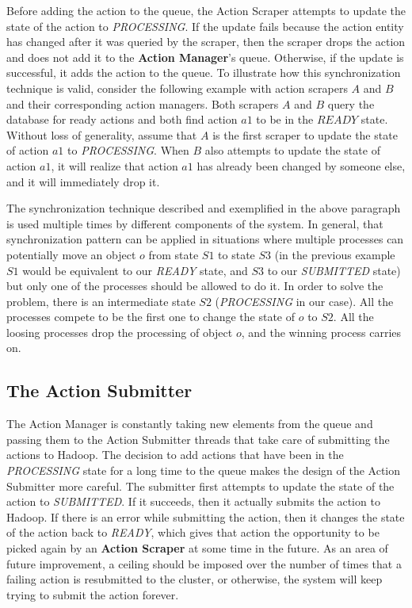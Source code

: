 Before adding the action to the queue, the Action Scraper attempts to update the state of the action to \textit{PROCESSING}. If the update fails because the action entity has changed after it was queried by the scraper, then the scraper drops the action and does not add it to the \textbf{Action Manager}'s queue. Otherwise, if the update is successful, it adds the action to the queue. To illustrate how this synchronization technique is valid, consider the following example with action scrapers $A$ and $B$ and their corresponding action managers. Both scrapers $A$ and $B$ query the database for ready actions and both find action $a1$ to be in the $READY$ state. Without loss of generality, assume that $A$ is the first scraper to update the state of action $a1$ to \textit{PROCESSING}. When $B$ also attempts to update the state of action $a1$, it will realize that action $a1$ has already been changed by someone else, and it will immediately drop it.

The synchronization technique described and exemplified in the above paragraph is used multiple times by different components of the system. In general, that synchronization pattern can be applied in situations where multiple processes can potentially move an object $o$ from state $S1$ to state $S3$ (in the previous example $S1$ would be equivalent to our \textit{READY} state, and $S3$ to our \textit{SUBMITTED} state) but only one of the processes should be allowed to do it. In order to solve the problem, there is an intermediate state $S2$ (\textit{PROCESSING} in our case).  All the processes compete to be the first one to change the state of $o$ to $S2$. All the loosing processes drop the processing of object $o$, and the winning process carries on.

\subsection{The Action Submitter}
The Action Manager is constantly taking new elements from the queue and passing them to the Action Submitter threads that take care of submitting the actions to Hadoop. The decision to add actions that have been in the \textit{PROCESSING} state for a long time to the queue makes the design of the Action Submitter more careful. The submitter first attempts to update the state of the action to \textit{SUBMITTED}. If it succeeds, then it actually submits the action to Hadoop. If there is an error while submitting the action, then it changes the state of the action back to \textit{READY}, which gives that action the opportunity to be picked again by an \textbf{Action Scraper} at some time in the future. As an area of future improvement, a ceiling should be imposed over the number of times that a failing action is resubmitted to the cluster, or otherwise, the system will keep trying to submit the action forever.

